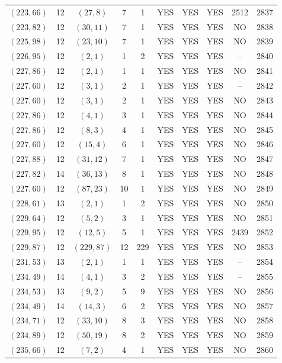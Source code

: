 \begin{longtable}{|c|c|c|c|c|c|c|c|c|c|}
$(223, 66)$ & 12 & $(27, 8)$ & 7 & 1 & YES & YES & YES & 2512 & 2837\\
$(223, 82)$ & 12 & $(30, 11)$ & 7 & 1 & YES & YES & YES & NO & 2838\\
$(225, 98)$ & 12 & $(23, 10)$ & 7 & 1 & YES & YES & YES & NO & 2839\\
$(226, 95)$ & 12 & $(2, 1)$ & 1 & 2 & YES & YES & YES & -- & 2840\\
$(227, 86)$ & 12 & $(2, 1)$ & 1 & 1 & YES & YES & YES & NO & 2841\\
$(227, 60)$ & 12 & $(3, 1)$ & 2 & 1 & YES & YES & YES & -- & 2842\\
$(227, 60)$ & 12 & $(3, 1)$ & 2 & 1 & YES & YES & YES & NO & 2843\\
$(227, 86)$ & 12 & $(4, 1)$ & 3 & 1 & YES & YES & YES & NO & 2844\\
$(227, 86)$ & 12 & $(8, 3)$ & 4 & 1 & YES & YES & YES & NO & 2845\\
$(227, 60)$ & 12 & $(15, 4)$ & 6 & 1 & YES & YES & YES & NO & 2846\\
$(227, 88)$ & 12 & $(31, 12)$ & 7 & 1 & YES & YES & YES & NO & 2847\\
$(227, 82)$ & 14 & $(36, 13)$ & 8 & 1 & YES & YES & YES & NO & 2848\\
$(227, 60)$ & 12 & $(87, 23)$ & 10 & 1 & YES & YES & YES & NO & 2849\\
$(228, 61)$ & 13 & $(2, 1)$ & 1 & 2 & YES & YES & YES & NO & 2850\\
$(229, 64)$ & 12 & $(5, 2)$ & 3 & 1 & YES & YES & YES & NO & 2851\\
$(229, 95)$ & 12 & $(12, 5)$ & 5 & 1 & YES & YES & YES & 2439 & 2852\\
$(229, 87)$ & 12 & $(229, 87)$ & 12 & 229 & YES & YES & YES & NO & 2853\\
$(231, 53)$ & 13 & $(2, 1)$ & 1 & 1 & YES & YES & YES & -- & 2854\\
$(234, 49)$ & 14 & $(4, 1)$ & 3 & 2 & YES & YES & YES & -- & 2855\\
$(234, 53)$ & 13 & $(9, 2)$ & 5 & 9 & YES & YES & YES & NO & 2856\\
$(234, 49)$ & 14 & $(14, 3)$ & 6 & 2 & YES & YES & YES & NO & 2857\\
$(234, 71)$ & 12 & $(33, 10)$ & 8 & 3 & YES & YES & YES & NO & 2858\\
$(234, 89)$ & 12 & $(50, 19)$ & 8 & 2 & YES & YES & YES & NO & 2859\\
$(235, 66)$ & 12 & $(7, 2)$ & 4 & 1 & YES & YES & YES & NO & 2860\\

\end{longtable}
